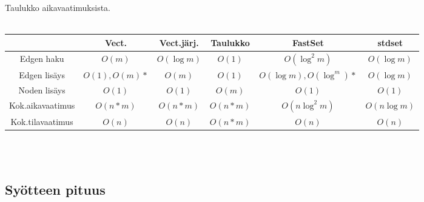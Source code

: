 \documentclass{article}
\begin{document}
        Taulukko aikavaatimuksista. \\ \\
        \begin{tabular}{c|c|c|c|c|c} \hline
                            &\textbf{Vect.}&\textbf{Vect.järj.}&\textbf{Taulukko}&\textbf{FastSet}        &\textbf{stdset}\\ \hline
            Edgen haku      &$O(m)$        &$O(\log m)$        &$O(1)$           &$O(\log^2 m)$           &$O(\log m)$     \\ \hline
            Edgen lisäys    &$O(1), O(m)*$ &$O(m)$             &$O(1)$           &$O(\log m), O(\log^ m)*$&$O(\log m)$     \\ \hline
            Noden lisäys    &$O(1)$        &$O(1)$             &$O(m)$           &$O(1)$                  &$O(1)$         \\ \hline
            Kok.aikavaatimus&$O(n*m)$      &$O(n*m)$           &$O(n*m)$         &$O(n \log^2 m)$         &$O(n \log m)$   \\ \hline
            Kok.tilavaatimus&$O(n)$        &$O(n)$             &$O(n*m)$         &$O(n)$                  &$O(n)$         \\
        \end{tabular} \\ \\

        \newpage
        \subsection{Syötteen pituus}
        
\end{document}
